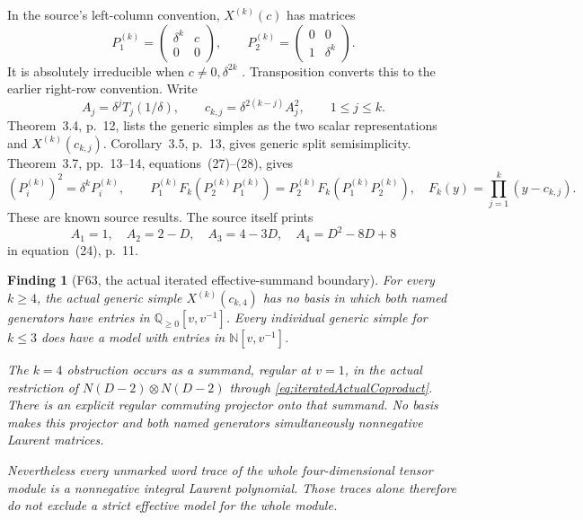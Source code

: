 \documentclass[11pt,a4paper]{article}
\renewcommand{\S}{\ensuremath{\mathsection}}
\newcommand{\fid}[1]{\textsf{#1}}\newcommand{\gate}[1]{\textsf{#1}}
\theoremstyle{named}\newtheorem{finding}{Finding}[section]
\theoremstyle{definition}\newtheorem{definition}[finding]{Definition}
\theoremstyle{remark}\newtheorem{remark}[finding]{Remark}
\begin{document}
In the source's left-column convention,
\(X^{(k)}(c)\) has matrices
\begin{equation}\label{eq:iteratedSourceSimple}
 P_1^{(k)}=\begin{pmatrix}\delta^k&c\\0&0\end{pmatrix},
 \qquad
 P_2^{(k)}=\begin{pmatrix}0&0\\1&\delta^k\end{pmatrix}.
\end{equation}
It is absolutely irreducible when \(c\ne0,\delta^{2k}\)
\cite[\S3.1, equations~(13)--(14), pp.~8--9]{BlasiakChebyshev}.
Transposition converts this to the earlier right-row convention.
Write
\[
 A_j=\delta^jT_j(1/\delta),\qquad
 c_{k,j}=\delta^{2(k-j)}A_j^2,\qquad 1\le j\le k.
\]
Theorem~3.4, p.~12, lists the generic simples as the two
scalar representations and \(X^{(k)}(c_{k,j})\).
Corollary~3.5, p.~13, gives generic split semisimplicity.
Theorem~3.7, pp.~13--14, equations~(27)--(28), gives
\[
 (P_i^{(k)})^2=\delta^kP_i^{(k)},\qquad
 P_1^{(k)}F_k(P_2^{(k)}P_1^{(k)})
 =P_2^{(k)}F_k(P_1^{(k)}P_2^{(k)}),
 \quad F_k(y)=\prod_{j=1}^k(y-c_{k,j}).
\]
These are known source results. The source itself prints
\begin{equation}\label{eq:iteratedChebyshevParameters}
 A_1=1,\quad A_2=2-D,\quad A_3=4-3D,\quad
 A_4=D^2-8D+8
\end{equation}
in equation~(24), p.~11.

\begin{finding}[\fid{F63}, the actual iterated effective-summand boundary]
\label{f:iteratedChebyshevGate}
For every \(k\ge4\), the actual generic simple
\(X^{(k)}(c_{k,4})\) has no basis in which both named
generators have entries in \(\mathbb Q_{\ge0}[v,v^{-1}]\).
Every individual generic simple for \(k\le3\) does have
a model with entries in \(\mathbb N[v,v^{-1}]\).

The \(k=4\) obstruction occurs as a summand, regular at \(v=1\),
in the actual restriction of \(N(D-2)\otimes N(D-2)\)
through \eqref{eq:iteratedActualCoproduct}.
There is an explicit regular commuting projector onto that
summand. No basis makes this projector and both named generators
simultaneously nonnegative Laurent matrices.

Nevertheless every unmarked word trace of the whole
four-dimensional tensor module is a nonnegative integral Laurent
polynomial. Those traces alone therefore do not exclude a
strict effective model for the whole module.
\end{finding}
\end{document}
